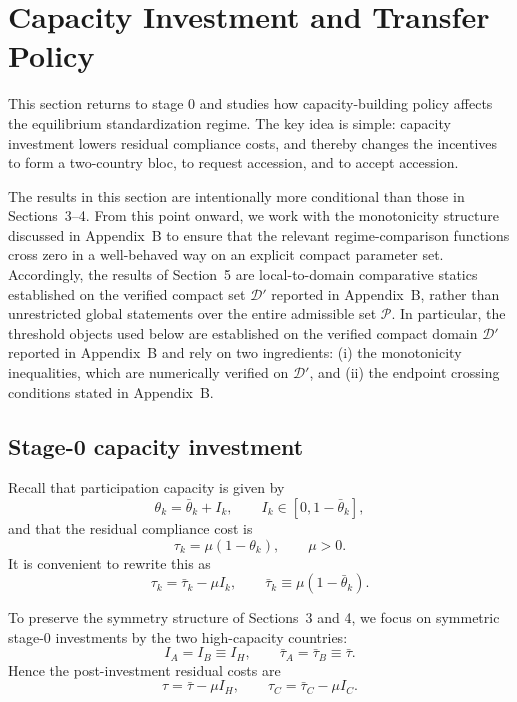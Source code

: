 \section{Capacity Investment and Transfer Policy}

This section returns to stage 0 and studies how capacity-building policy
affects the equilibrium standardization regime. The key idea is simple:
capacity investment lowers residual compliance costs, and thereby changes the
incentives to form a two-country bloc, to request accession, and to accept
accession.

The results in this section are intentionally more conditional than those in
Sections~3--4. From this point onward, we work with the monotonicity structure
discussed in Appendix~B to ensure that the relevant regime-comparison
functions cross zero in a well-behaved way on an explicit compact parameter
set. Accordingly, the results of Section~5 are local-to-domain comparative
statics established on the verified compact set $\mathcal D'$ reported in
Appendix~B, rather than unrestricted global statements over the entire
admissible set $\mathcal P$.
In particular, the threshold objects used below are established on the
verified compact domain $\mathcal D'$ reported in Appendix~B and rely on two
ingredients: (i) the monotonicity inequalities, which are numerically verified
on $\mathcal D'$, and (ii) the endpoint crossing conditions stated in
Appendix~B.

\subsection{Stage-0 capacity investment}

Recall that participation capacity is given by
\[
\theta_k=\bar\theta_k+I_k,
\qquad
I_k\in[0,1-\bar\theta_k],
\]
and that the residual compliance cost is
\[
\tau_k=\mu(1-\theta_k), \qquad \mu>0.
\]
It is convenient to rewrite this as
\begin{equation}
\tau_k=\bar\tau_k-\mu I_k,
\qquad
\bar\tau_k\equiv \mu(1-\bar\theta_k).
\label{eq:tau_from_x}
\end{equation}

To preserve the symmetry structure of Sections~3 and 4, we focus on symmetric
stage-0 investments by the two high-capacity countries:
\[
I_A=I_B\equiv I_H,
\qquad
\bar\tau_A=\bar\tau_B\equiv \bar\tau.
\]
Hence the post-investment residual costs are
\begin{equation}
\tau=\bar\tau-\mu I_H,
\qquad
\tau_C=\bar\tau_C-\mu I_C.
\label{eq:tau_tauC_from_x}
\end{equation}

